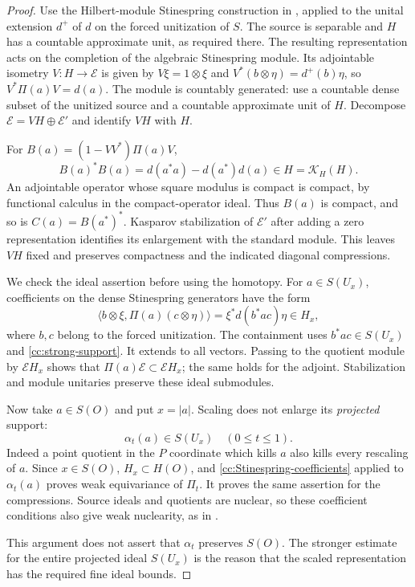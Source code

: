 \begin{proof}
Use the Hilbert-module Stinespring construction in
\cite[proof of Theorem~3, pp.~140--141]{Kasparov}, applied to the
unital extension $d^+$ of $d$ on the forced unitization of $S$.
The source is separable and $H$ has a countable approximate unit,
as required there.
The resulting representation acts on the completion of the
algebraic Stinespring module.  Its adjointable isometry
$V:H\to\mathcal E$ is given by
$V\xi=1\otimes\xi$ and
$V^*(b\otimes\eta)=d^+(b)\eta$, so
$V^*\Pi(a)V=d(a)$.  The module is countably generated:
use a countable dense subset of the unitized source and a countable
approximate unit of $H$.  Decompose
$\mathcal E=VH\oplus\mathcal E'$ and identify $VH$ with $H$.

For $B(a)=(1-VV^*)\Pi(a)V$,
\begin{equation}\label{cc:compact-offdiagonal}
 B(a)^*B(a)=d(a^*a)-d(a^*)d(a)\in H
 =\mathcal K_H(H).
\end{equation}
An adjointable operator whose square modulus is compact is compact,
by functional calculus in the compact-operator ideal.  Thus $B(a)$
is compact, and so is $C(a)=B(a^*)^*$.  Kasparov stabilization
\cite[Theorem~2]{Kasparov} of $\mathcal E'$ after adding a zero
representation identifies its
enlargement with the standard module.  This leaves $VH$ fixed and
preserves compactness and the indicated diagonal compressions.

We check the ideal assertion before using the homotopy.  For
$a\in S(U_x)$, coefficients on the dense Stinespring generators
have the form
\begin{equation}\label{cc:Stinespring-coefficients}
 \langle b\otimes\xi,\Pi(a)(c\otimes\eta)\rangle
 =\xi^*d(b^*ac)\eta\in H_x,
\end{equation}
where $b,c$ belong to the forced unitization.  The containment uses
$b^*ac\in S(U_x)$ and \eqref{cc:strong-support}.  It extends to
all vectors.  Passing to the quotient module by $\mathcal E H_x$
shows that $\Pi(a)\mathcal E\subset\mathcal E H_x$; the same
holds for the adjoint.  Stabilization and module unitaries preserve
these ideal submodules.

Now take $a\in S(O)$ and put $x=|a|$.  Scaling does not enlarge its
\emph{projected} support:
\begin{equation}\label{cc:projected-scaling}
 \alpha_t(a)\in S(U_x)\quad(0\le t\le1).
\end{equation}
Indeed a point quotient in the $P$ coordinate which kills $a$
also kills every rescaling of $a$.  Since $x\in S(O)$,
$H_x\subset H(O)$, and \eqref{cc:Stinespring-coefficients}
applied to $\alpha_t(a)$ proves weak equivariance of $\Pi_t$.
It proves the same assertion for the compressions.  Source ideals
and quotients are nuclear, so these coefficient conditions also
give weak nuclearity, as in .

This argument does not assert that $\alpha_t$ preserves $S(O)$.
The stronger estimate for the entire projected ideal
$S(U_x)$ is the reason that the scaled representation has the
required fine ideal bounds.
\end{proof}


